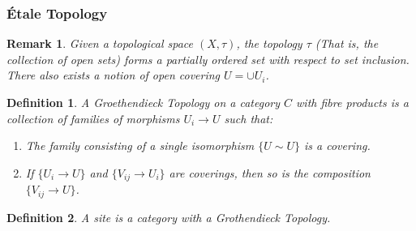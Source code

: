 \documentclass[oneside]{book}
\theoremstyle{mystyle}
\newtheorem{definition}{Definition}[section]
\newtheorem{remark}{Remark}[section]
\begin{document}
\subsubsection{\'{E}tale Topology}
\begin{remark}
Given a topological space $(X,\tau)$, the topology $\tau$ (That is, the collection of open sets) forms a partially ordered set with respect to set inclusion. There also exists a notion of open covering $U = \cup U_i$.
\end{remark}
\begin{definition}
A Groethendieck Topology on a category $C$ with fibre products is a collection of families of morphisms $U_i \rightarrow U$ such that:
\begin{enumerate}
    \item The family consisting of a single isomorphism $\{U \sim U\}$ is a covering.
    \item If $\{U_i\rightarrow U\}$ and $\{V_{ij} \rightarrow U_i\}$ are coverings, then so is the composition $\{V_{ij}\rightarrow U\}$.
\end{enumerate}
\end{definition}
\begin{definition}
A site is a category with a Grothendieck Topology.
\end{definition}
\end{document}
